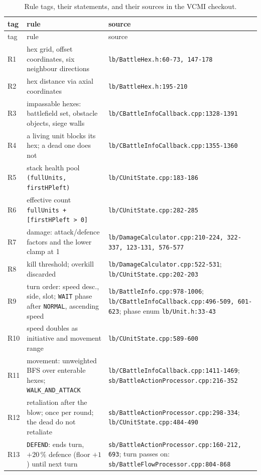 \documentclass[11pt,a4paper]{article}
\theoremstyle{plain}
\theoremstyle{definition}
\theoremstyle{plain}
\theoremstyle{definition}
\theoremstyle{remark}
\newcommand{\src}[1]{\texttt{#1}}
\begin{document}
\begingroup
\small
\begin{longtable}{@{}p{0.8cm}p{6.0cm}p{6.8cm}@{}}
\caption{Rule tags, their statements, and their sources in the VCMI checkout.}\label{tab:rules}\\
\toprule
tag & rule & source \\
\midrule
\endfirsthead
\toprule
tag & rule & source \\
\midrule
\endhead
\bottomrule
\endfoot
R1 & hex grid, offset coordinates, six neighbour directions & \src{lb/BattleHex.h:60-73, 147-178} \\
R2 & hex distance via axial coordinates & \src{lb/BattleHex.h:195-210} \\
R3 & impassable hexes: battlefield set, obstacle objects, siege walls & \src{lb/CBattleInfoCallback.cpp:1328-1391} \\
R4 & a living unit blocks its hex; a dead one does not & \src{lb/CBattleInfoCallback.cpp:1355-1360} \\
R5 & stack health pool \src{(fullUnits, firstHPleft)} & \src{lb/CUnitState.cpp:183-186} \\
R6 & effective count \src{fullUnits + [firstHPleft > 0]} & \src{lb/CUnitState.cpp:282-285} \\
R7 & damage: attack/defence factors and the lower clamp at 1 & \src{lb/DamageCalculator.cpp:210-224, 322-337, 123-131, 576-577} \\
R8 & kill threshold; overkill discarded & \src{lb/DamageCalculator.cpp:522-531}; \src{lb/CUnitState.cpp:202-203} \\
R9 & turn order: speed desc., side, slot; \texttt{WAIT} phase after \texttt{NORMAL}, ascending speed & \src{lb/BattleInfo.cpp:978-1006}; \src{lb/CBattleInfoCallback.cpp:496-509, 601-623}; phase enum \src{lb/Unit.h:33-43} \\
R10 & speed doubles as initiative and movement range & \src{lb/CUnitState.cpp:589-600} \\
R11 & movement: unweighted BFS over enterable hexes; \texttt{WALK\_AND\_ATTACK} & \src{lb/CBattleInfoCallback.cpp:1411-1469}; \src{sb/BattleActionProcessor.cpp:216-352} \\
R12 & retaliation after the blow; once per round; the dead do not retaliate & \src{sb/BattleActionProcessor.cpp:298-334}; \src{lb/CUnitState.cpp:484-490} \\
R13 & \texttt{DEFEND}: ends turn, $+20\,\%$ defence (floor $+1$) until next turn & \src{sb/BattleActionProcessor.cpp:160-212, 693}; turn passes on: \src{sb/BattleFlowProcessor.cpp:804-868} \\

\end{longtable}
\end{document}
